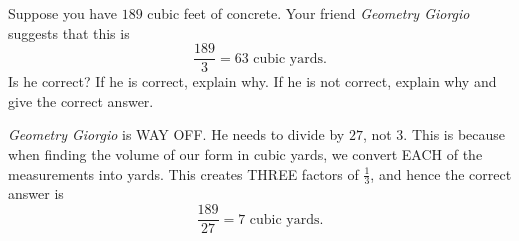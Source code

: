 \documentclass[handout,nooutcomes,noauthor]{ximera}
\begin{document}
\begin{question}
  Suppose you have $189$ cubic feet of concrete. Your friend \textit{Geometry
    Giorgio} suggests that this is
  \[
  \frac{189}{3} = 63 \text{ cubic yards}.
  \]
  Is he correct? If he is correct, explain why. If he is not correct,
  explain why and give the correct answer.
  \begin{freeResponse}
     \textit{Geometry Giorgio} is WAY OFF. He needs to divide by $27$,
     not $3$. This is because when finding the volume of our form in
     cubic yards, we convert EACH of the measurements into yards. This
     creates THREE factors of $\frac{1}{3}$, and hence the correct
     answer is
     \[
     \frac{189}{27} = 7 \text{ cubic yards}.
     \]
  \end{freeResponse}
\end{question}
\mynewpage
\end{document}

